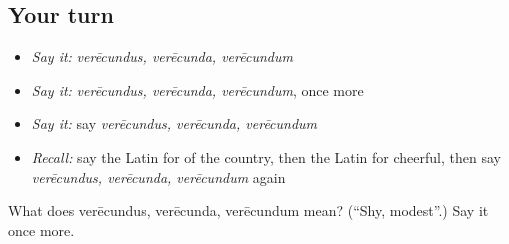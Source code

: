 \subsection*{Your turn}
\begin{itemize}
\raggedright
  \item \emph{Say it:} \emph{verēcundus, verēcunda, verēcundum}
  \item \emph{Say it:} \emph{verēcundus, verēcunda, verēcundum}, once more
  \item \emph{Say it:} say \emph{verēcundus, verēcunda, verēcundum}
  \item \emph{Recall:} say the Latin for of the country, then the Latin for cheerful, then say \emph{verēcundus, verēcunda, verēcundum} again
\end{itemize}

\begin{tcolorbox}[breakable,colback=teal!4,colframe=teal!35!black,title={Before you move on}]
What does verēcundus, verēcunda, verēcundum mean? (\textquotedblleft{}Shy, modest\textquotedblright{}.) Say it once more.
\end{tcolorbox}
